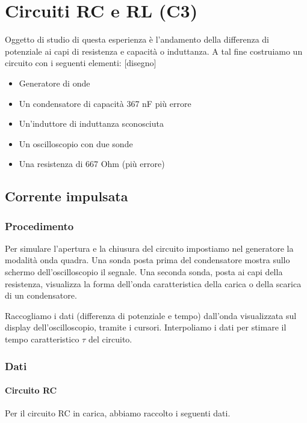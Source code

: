 \chapter{Circuiti RC e RL (C3)}

Oggetto di studio di questa esperienza è l'andamento della differenza di potenziale ai capi di resistenza e capacità o induttanza.
A tal fine costruiamo un circuito con i seguenti elementi:
[disegno]

\begin{itemize}
  \item Generatore di onde
  \item Un condensatore di capacità 367 nF più errore
  \item Un'induttore di induttanza sconosciuta
  \item Un oscilloscopio con due sonde
  \item Una resistenza di 667 Ohm (più errore)
\end{itemize}

\section{Corrente impulsata}
\subsection{Procedimento}


Per simulare l'apertura e la chiusura del circuito impostiamo nel generatore la modalità onda quadra. Una sonda posta prima del condensatore mostra sullo schermo dell'oscilloscopio il segnale.  
Una seconda sonda, posta ai capi della resistenza, visualizza la forma dell'onda caratteristica della carica o della scarica di un condensatore.

Raccogliamo i dati (differenza di potenziale e tempo) dall'onda visualizzata sul display dell'oscilloscopio, tramite i cursori. Interpoliamo i dati per stimare il tempo caratteristico $\tau$ del circuito.

\subsection{Dati}

\subsubsection{Circuito RC}

Per il circuito  RC in carica, abbiamo raccolto i seguenti dati. 

